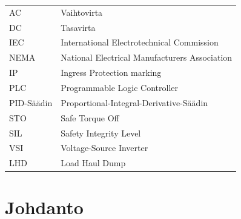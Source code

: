 \documentclass[finnish,12pt,a4paper,pdftex,elec,utf8]{aaltothesis}
\begin{document}
\begin{tabular}{ll}
AC         & Vaihtovirta \\
DC         & Tasavirta \\
IEC	       & International Electrotechnical Commission \\
NEMA       & National Electrical Manufacturers Association \\
IP		   & Ingress Protection marking \\
PLC		   & Programmable Logic Controller \\
PID-Säädin & Proportional-Integral-Derivative-Säädin \\
STO		   & Safe Torque Off \\
SIL		   & Safety Integrity Level \\
VSI		   & Voltage-Source Inverter \\
LHD		   & Load Haul Dump
\end{tabular}


\cleardoublepage
\storeinipagenumber
{}
\setcounter{page}{1}


\section{{\large Johdanto}}
\end{document}
